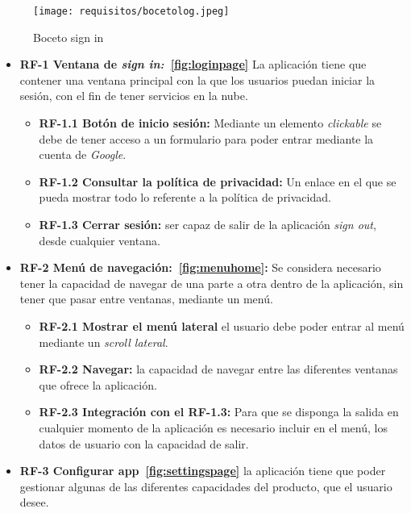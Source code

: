 \begin{figure}[H]
	\centering
	\texttt{[image: requisitos/bocetolog.jpeg]}
	\caption{Boceto sign in}\label{fig:bocetolog}
\end{figure}

\begin{itemize}
\tightlist
	\item \textbf{RF-1 Ventana de \emph{sign in:}~\ref{fig:loginpage}} La aplicación tiene que contener una ventana principal con la que los usuarios puedan iniciar la sesión, con el fin de tener servicios en la nube.
	
	\begin{itemize}
	\tightlist
	\item \textbf{RF-1.1 Botón de inicio sesión:} Mediante un elemento \emph{clickable} se debe de tener acceso a un formulario para poder entrar mediante la cuenta de \emph{Google}.
	\item \textbf{RF-1.2 Consultar la política de privacidad:} Un enlace en el que se pueda mostrar todo lo referente a la política de privacidad.
	\item \textbf{RF-1.3 Cerrar sesión:} ser capaz de salir de la aplicación \emph{sign out}, desde cualquier ventana.
	\end{itemize}
	
	\item \textbf{RF-2 Menú de navegación:~\ref{fig:menuhome}:} Se considera necesario tener la capacidad de navegar de una parte a otra dentro de la aplicación, sin tener que pasar entre ventanas, mediante un menú. 
	
	\begin{itemize}
		\tightlist
		\item \textbf{RF-2.1 Mostrar el menú lateral} el usuario debe poder entrar al menú mediante un \emph{scroll lateral}.
		\item \textbf{RF-2.2 Navegar:} la capacidad de navegar entre las diferentes ventanas que ofrece la aplicación.
		\item \textbf{RF-2.3 Integración con el RF-1.3:} Para que se disponga la salida en cualquier momento de la aplicación es necesario incluir en el menú, los datos de usuario con la capacidad de salir.
	\end{itemize}

	\item \textbf{RF-3 Configurar app~\ref{fig:settingspage}} la aplicación tiene que poder gestionar algunas de las diferentes capacidades del producto, que el usuario desee.
	

\end{itemize}
